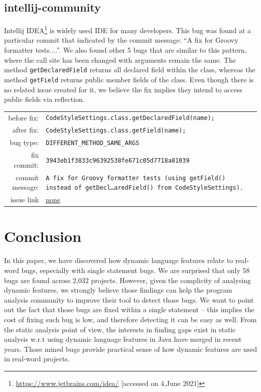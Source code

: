\documentclass[sigconf,review,anonymous]{acmart}
\begin{document}
\subsection{intellij-community}
Intellij IDEA\footnote{\url{https://www.jetbrains.com/idea/} [accessed on 4,June 2021]} is widely used IDE for many developers. This bug was found at a particular commit that indicated by the commit message: ``A fix for Groovy formatter tests....''.  We also found other 5 bugs that are similar to this pattern, where the call site has been changed with arguments remain the same. The method \texttt{getDeclaredField} \cite{javaclassapi} returns all declared field within the class, whereas the method \texttt{getField} \cite{javaclassapi} returns public member fields of the class. Even though there is no related issue created for it, we believe the fix implies they intend to access public fields via reflection.
\begin{table}[h!]
  \footnotesize
  \label{tab:intellij}
  \begin{tabular}{rp{5cm}}
    before fix:  &  \footnotesize{\texttt{CodeStyleSettings.class.getDeclaredField(name);}} \\
    after fix:  &  \footnotesize{\texttt{CodeStyleSettings.class.getField(name);}} \\
    bug type:   &  \texttt{DIFFERENT\_METHOD\_SAME\_ARGS} \\
    fix commit: &  \texttt{3943eb1f3833c96392538fe671c05d7718a81039} \\
    commit message:   &  \texttt{A fix for Groovy formatter tests (using getField() instead of getDecl…aredField() from CodeStyleSettings).}\\
    issue link &  \url{none}
  \end{tabular}
\end{table}   

\section{Conclusion}

In this paper, we have discovered how dynamic language features relate to real-word bugs, especially with single statement bugs. We are surprised that only 58 bugs are found across 2,032 projects. However, given the complicity of analysing dynamic features, we strongly believe those findings can help the program analysis community to improve their tool to detect those bugs.  We want to point out the fact that those bugs are fixed within a single statement -- this implies the cost of fixing such bug is low, and therefore detecting it can be easy as well. From the static analysis point of view, the interests in finding gaps exist in static analysis w.r.t using dynamic language features in Java \cite{sui2020recall} have merged in recent years.  Those mined bugs provide practical sense of how dynamic features are used in real-word projects.
\end{document}

